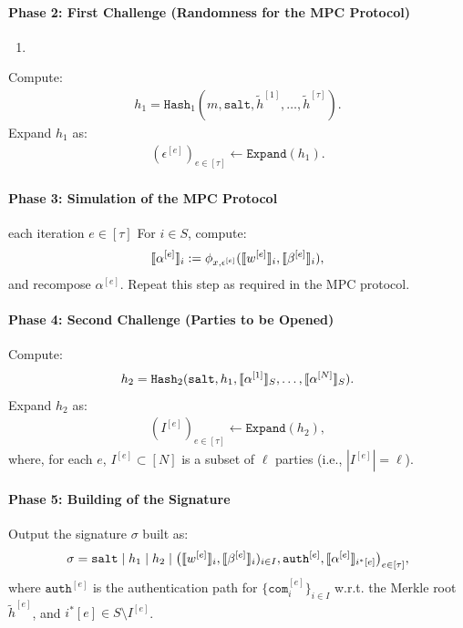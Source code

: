 \documentclass[11pt]{report}
\theoremstyle{definition}
\theoremstyle{plain}
\begin{document}
\begin{protocol}
  \paragraph{Phase 2: First Challenge (Randomness for the MPC Protocol)}
  \begin{enumerate}
    \item 
  \end{enumerate}
  Compute:
  \begin{align*}
    h_1 = \texttt{Hash}_1(m, \texttt{salt}, \tilde{h}^{[1]}, \ldots, \tilde{h}^{[\tau]}).
  \end{align*}
  Expand $h_1$ as:
  \begin{align*}
    (\epsilon^{[e]})_{e \in [\tau]} \leftarrow \texttt{Expand}(h_1).
  \end{align*}

  \paragraph{Phase 3: Simulation of the MPC Protocol}
  each iteration $e \in [\tau]$
  For $i \in S$, compute:
  \begin{align*}
    \llbracket \alpha^{[e]} \rrbracket_i := \phi_{x, \epsilon^{[e]}}(\llbracket w^{[e]} \rrbracket_i, \llbracket \beta^{[e]} \rrbracket_i),
  \end{align*}
  and recompose $\alpha^{[e]}$.
  Repeat this step as required in the MPC protocol.


  \paragraph{Phase 4: Second Challenge (Parties to be Opened)}
  Compute:
  \begin{align*}
    h_2 = \texttt{Hash}_2(\texttt{salt}, h_1, \llbracket \alpha^{[1]} \rrbracket_S, \ldots, \llbracket \alpha^{[N]} \rrbracket_S).
  \end{align*}
  Expand $h_2$ as:
  \begin{align*}
    (I^{[e]})_{e \in [\tau]} \leftarrow \texttt{Expand}(h_2),
  \end{align*}
  where, for each $e$, $I^{[e]} \subset [N]$ is a subset of $\ell$ parties (i.e., $|I^{[e]}| = \ell$).

  \paragraph{Phase 5: Building of the Signature}
  Output the signature $\sigma$ built as:
  \begin{align*}
    \sigma = \texttt{salt} \mid h_1 \mid h_2 \mid
    \big(\llbracket w^{[e]} \rrbracket_i, \llbracket \beta^{[e]} \rrbracket_i)_{i \in I}, \texttt{auth}^{[e]}, \llbracket \alpha^{[e]} \rrbracket_{i^*[e]} \big)_{e \in [\tau]},
  \end{align*}
  where $\texttt{auth}^{[e]}$ is the authentication path for $\{\texttt{com}_i^{[e]}\}_{i \in I}$ w.r.t. the Merkle root $\tilde{h}^{[e]}$, and $i^*[e] \in S \setminus I^{[e]}$.
\end{protocol}
\end{document}
